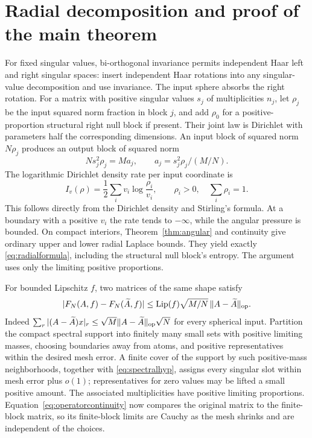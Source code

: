 \documentclass[11pt]{article}
\numberwithin{equation}{section}
\theoremstyle{definition}
\newcommand{\Lip}{\operatorname{Lip}}
\newcommand{\norm}[1]{\lVert #1\rVert}
\begin{document}
\section{Radial decomposition and proof of the main theorem}
\label{sec:radial}
For fixed singular values, bi-orthogonal invariance permits independent Haar left and right singular spaces: insert independent Haar rotations into any singular-value decomposition and use invariance. The input sphere absorbs the right rotation. For a matrix with positive singular values $s_j$ of multiplicities $n_j$, let $\rho_j$ be the input squared norm fraction in block $j$, and add $\rho_0$ for a positive-proportion structural right null block if present. Their joint law is Dirichlet with parameters half the corresponding dimensions. An input block of squared norm $N\rho_j$ produces an output block of squared norm
\[
Ns_j^2\rho_j=M a_j,\qquad a_j=s_j^2\rho_j/(M/N).
\]
The logarithmic Dirichlet density rate per input coordinate is
\begin{equation}\label{eq:Dirichletrate}
I_v(\rho)=\frac12\sum_i v_i\log\frac{\rho_i}{v_i},
\qquad \rho_i>0,\quad \sum_i\rho_i=1.
\end{equation}
This follows directly from the Dirichlet density and Stirling's formula. At a boundary with a positive $v_i$ the rate tends to $-\infty$, while the angular pressure is bounded. On compact interiors, Theorem~\ref{thm:angular} and continuity give ordinary upper and lower radial Laplace bounds. They yield exactly \eqref{eq:radialformula}, including the structural null block's entropy. The argument uses only the limiting positive proportions.

For bounded Lipschitz $f$, two matrices of the same shape satisfy
\begin{equation}\label{eq:operatorcontinuity}
|F_N(A,f)-F_N(\widetilde A,f)|
\le\Lip(f)\sqrt{M/N}\,\norm{A-\widetilde A}_{\rm op}.
\end{equation}
Indeed $\sum_r|(A-\widetilde A)x|_r\le\sqrt M\norm{A-\widetilde A}_{\rm op}\sqrt N$ for every spherical input. Partition the compact spectral support into finitely many small sets with positive limiting masses, choosing boundaries away from atoms, and positive representatives within the desired mesh error. A finite cover of the support by such positive-mass neighborhoods, together with \eqref{eq:spectralhyp}, assigns every singular slot within mesh error plus $o(1)$; representatives for zero values may be lifted a small positive amount. The associated multiplicities have positive limiting proportions. Equation~\eqref{eq:operatorcontinuity} now compares the original matrix to the finite-block matrix, so its finite-block limits are Cauchy as the mesh shrinks and are independent of the choices.
\end{document}
